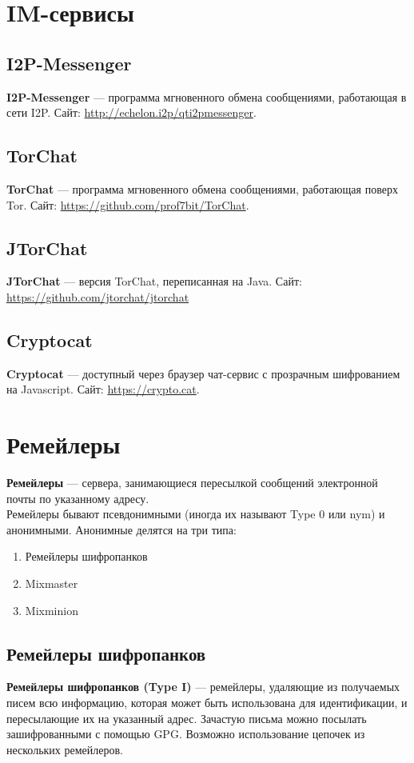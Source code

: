 \section{IM-сервисы}
\subsection{I2P-Messenger}
\textbf{I2P-Messenger} --- программа мгновенного обмена сообщениями, работающая в сети I2P. Сайт: \url{http://echelon.i2p/qti2pmessenger}.
\subsection{TorChat}
\textbf{TorChat} --- программа мгновенного обмена сообщениями, работающая поверх Tor. Сайт: \url{https://github.com/prof7bit/TorChat}.
\subsection{JTorChat}
\textbf{JTorChat} --- версия TorChat, переписанная на Java. Сайт: \url{https://github.com/jtorchat/jtorchat}
\subsection{Cryptocat}
\textbf{Cryptocat} --- доступный через браузер чат-сервис с прозрачным шифрованием на Javascript. Сайт: \url{https://crypto.cat}.

\section{Ремейлеры}
\textbf{Ремейлеры} --- сервера, занимающиеся пересылкой сообщений электронной почты по указанному адресу.\\
Ремейлеры бывают псевдонимными (иногда их называют Type 0 или nym) и анонимными. Анонимные делятся на три типа:
\begin{enumerate}
\item Ремейлеры шифропанков
\item Mixmaster 
\item Mixminion
\end{enumerate}
\subsection{Ремейлеры шифропанков}
\textbf{Ремейлеры шифропанков (Type I)} --- ремейлеры, удаляющие из получаемых писем всю информацию, которая может быть использована для идентификации, и пересылающие их на указанный адрес. Зачастую письма можно посылать зашифрованными с помощью GPG. Возможно использование цепочек из нескольких ремейлеров.
